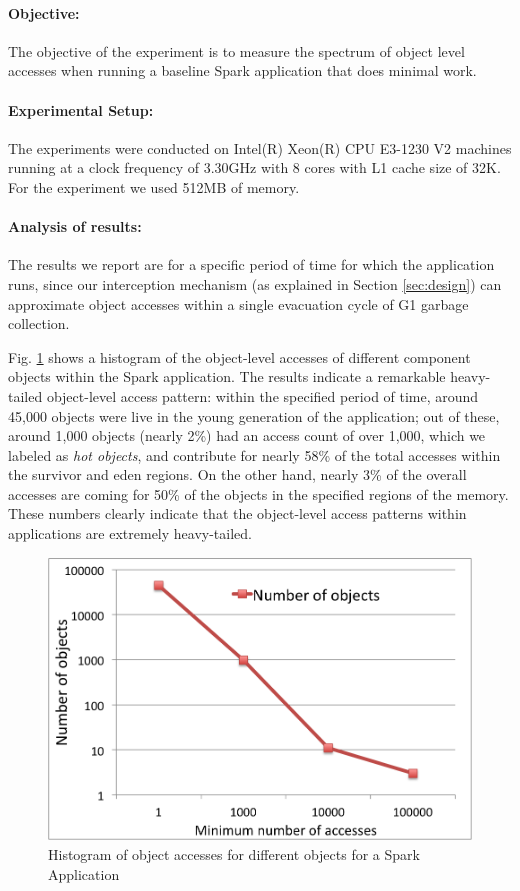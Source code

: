 \paragraph{Objective:}
The objective of the experiment is to measure the spectrum of object
level accesses when running a baseline Spark application that does
minimal work. 

\paragraph{Experimental Setup:} 
The experiments were conducted on Intel(R) Xeon(R) CPU E3-1230 V2
machines running at a clock frequency of 3.30GHz with 8 cores with L1
cache size of 32K. For the experiment we used 512MB of memory.

\paragraph{Analysis of results:} 
The results we report are for a specific period of time for which the
application runs, since our interception mechanism (as explained in
Section \ref{sec:design}) can approximate object accesses within a
single evacuation cycle of G1 garbage collection.

Fig. \ref{fig:exp6} shows a histogram of the object-level accesses
of different component objects within the Spark application. The results
indicate a remarkable heavy-tailed object-level access pattern: within
the specified period of time, around 45,000 objects were live in the young
generation of the application; out of these, around 1,000 objects
(nearly 2\%) had an access count of over 1,000, which we labeled as
\emph{hot objects}, and contribute for nearly 58\% of the total accesses
within the survivor and eden regions.
On the other hand, nearly 3\% of the overall accesses are coming for
50\% of the objects in the specified regions of the memory.
These numbers clearly indicate that the object-level access patterns
within applications are extremely heavy-tailed. 

\begin{figure}[!ht]
\caption{Histogram of object accesses for different objects for a Spark Application}
\label{fig:exp6}
\includegraphics[scale=0.50]{./images/exp6.png}
\end{figure}


